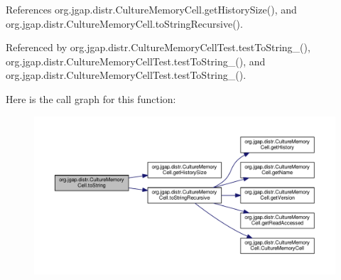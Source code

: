 References org.\-jgap.\-distr.\-Culture\-Memory\-Cell.\-get\-History\-Size(), and org.\-jgap.\-distr.\-Culture\-Memory\-Cell.\-to\-String\-Recursive().



Referenced by org.\-jgap.\-distr.\-Culture\-Memory\-Cell\-Test.\-test\-To\-String\-\_(), org.\-jgap.\-distr.\-Culture\-Memory\-Cell\-Test.\-test\-To\-String\-\_(), and org.\-jgap.\-distr.\-Culture\-Memory\-Cell\-Test.\-test\-To\-String\-\_().



Here is the call graph for this function\-:
\nopagebreak
\begin{figure}[H]
\begin{center}
\leavevmode
\includegraphics[width=350pt]{classorg_1_1jgap_1_1distr_1_1_culture_memory_cell_a6d16482e95c3d40f67511f43bc9f57dd_cgraph}
\end{center}
\end{figure}


